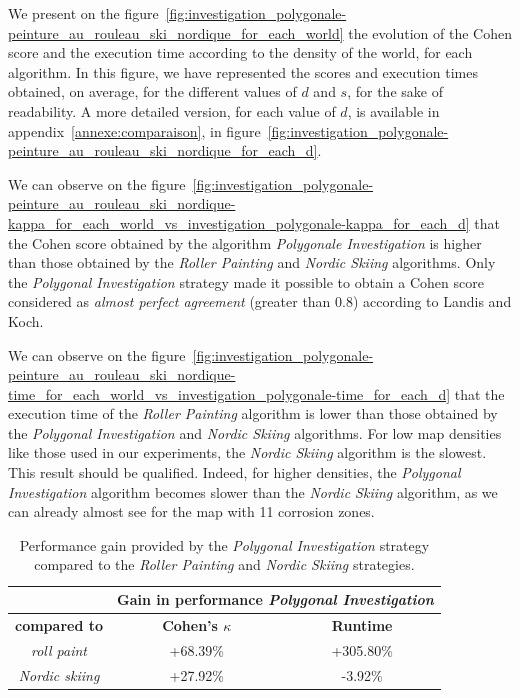 We present on the figure~\ref{fig:investigation_polygonale-peinture_au_rouleau_ski_nordique_for_each_world} the evolution of the Cohen score and the execution time according to the density of the world, for each algorithm.
In this figure, we have represented the scores and execution times obtained, on average, for the different values of $d$ and $s$, for the sake of readability.
A more detailed version, for each value of $d$, is available in appendix~\ref{annexe:comparaison}, in figure~\ref{fig:investigation_polygonale-peinture_au_rouleau_ski_nordique_for_each_d}.

We can observe on the figure~\ref{fig:investigation_polygonale-peinture_au_rouleau_ski_nordique-kappa_for_each_world_vs_investigation_polygonale-kappa_for_each_d} that the Cohen score obtained by the algorithm \textit{Polygonale Investigation} is higher than those obtained by the \textit{Roller Painting} and \textit{Nordic Skiing} algorithms.
Only the \textit{Polygonal Investigation} strategy made it possible to obtain a Cohen score considered as \textit{almost perfect agreement} (greater than 0.8) according to Landis and Koch.

We can observe on the figure~\ref{fig:investigation_polygonale-peinture_au_rouleau_ski_nordique-time_for_each_world_vs_investigation_polygonale-time_for_each_d} that the execution time of the \textit{Roller Painting} algorithm is lower than those obtained by the \textit{Polygonal Investigation} and \textit{Nordic Skiing} algorithms.
For low map densities like those used in our experiments, the \textit{Nordic Skiing} algorithm is the slowest.
This result should be qualified.
Indeed, for higher densities, the \textit{Polygonal Investigation} algorithm becomes slower than the \textit{Nordic Skiing} algorithm, as we can already almost see for the map with 11 corrosion zones.

\begin{table}[h!]
	\centering
	\begin{tabular}{|c|c|c|}
		\hline
		& \multicolumn{2}{c|}{\textbf{Gain in performance \textit{Polygonal Investigation}}} \\
		\hline
		\textbf{compared to} & \textbf{Cohen's $\kappa$} & \textbf{Runtime} \\
		\hline
		\textit{roll paint} & +68.39\% & +305.80\% \\
		\hline
		\textit{Nordic skiing} & +27.92\% & -3.92\% \\
		\hline
	\end{tabular}
	\caption{Performance gain provided by the \textit{Polygonal Investigation} strategy compared to the \textit{Roller Painting} and \textit{Nordic Skiing} strategies.}
	\label{tab:gain}
\end{table}

